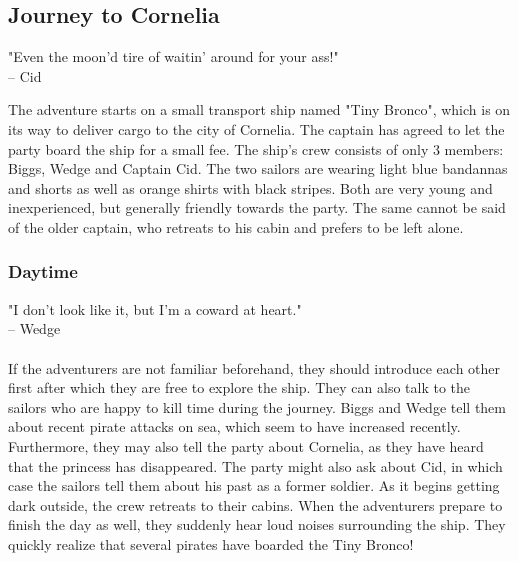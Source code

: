\subsection*{Journey to Cornelia}
"Even the moon'd tire of waitin' around for your ass!"\\
\indent-- Cid 
\begin{center} 
\end{center}
The adventure starts on a small transport ship named "Tiny Bronco", which is on its way to deliver cargo to the city of Cornelia.
The captain has agreed to let the party board the ship for a small fee.
The ship's crew consists of only 3 members: Biggs, Wedge and Captain Cid.
The two sailors are wearing light blue bandannas and shorts as well as orange shirts with black stripes.
Both are very young and inexperienced, but generally friendly towards the party.
The same cannot be said of the older captain, who retreats to his cabin and prefers to be left alone.

\subsubsection*{Daytime}  
"I don't look like it, but I'm a coward at heart."\\
\indent-- Wedge \\\\
If the adventurers are not familiar beforehand, they should introduce each other first after which they are free to explore the ship.
They can also talk to the sailors who are happy to kill time during the journey.
Biggs and Wedge tell them about recent pirate attacks on sea, which seem to have increased recently.
Furthermore, they may also tell the party about Cornelia, as they have heard that the princess has disappeared.
The party might also ask about Cid, in which case the sailors tell them about his past as a former soldier.
As it begins getting dark outside, the crew retreats to their cabins.
When the adventurers prepare to finish the day as well, they suddenly hear loud noises surrounding the ship.
They quickly realize that several pirates have boarded the Tiny Bronco!

